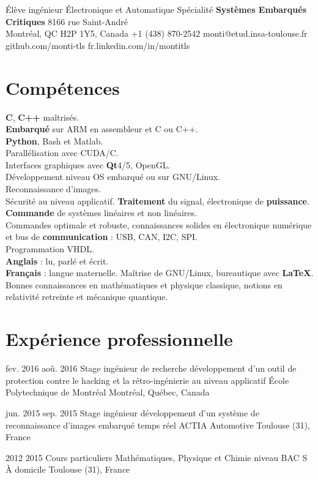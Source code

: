 \documentclass{custom_cv}
\begin{document}
           {Élève ingénieur}
           {Électronique et Automatique}
           {Spécialité \textbf{Systèmes Embarqués Critiques}}
           {8166 rue Saint-André\\Montréal, QC H2P 1Y5, Canada}
           {+1 (438) 870-2542}
           {monti@etud.insa-toulouse.fr}
           {github.com/monti-tls}
           {fr.linkedin.com/in/montitls}

\section{Compétences}

\begin{Skills}%
{\textbf{C}, \textbf{C++} maîtrisés.\\
\textbf{Embarqué} sur ARM en assembleur et C ou C++.\\
\textbf{Python}, Bash et Matlab.\\
Parallélisation avec CUDA/C.\\
Interfaces graphiques avec \textbf{Qt}4/5, OpenGL.\\
Développement niveau OS embarqué ou sur GNU/Linux.\\
Reconnaissance d'images.\\
Sécurité au niveau applicatif.}%
{\textbf{Traitement} du signal, électronique de \textbf{puissance}.\\
\textbf{Commande} de systèmes linéaires et non linéaires.\\
Commandes optimale et robuste, connaissances solides en électronique numérique et bus de \textbf{communication} : USB, CAN, I2C, SPI.\\
Programmation VHDL.}\\
{\textbf{Anglais} : lu, parlé et écrit.\\
\textbf{Français} : langue maternelle.}%
{Maîtrise de GNU/Linux, bureautique avec \textbf{\LaTeX}.\\
Bonnes connaissances en mathématiques et physique classique, notions en relativité retreinte et mécanique quantique.}%
\end{Skills}

\section{Expérience professionnelle}
\begin{Experience}
    \Item
    {fev. 2016}
    {aoû. 2016}
    {Stage ingénieur de recherche}
    {développement d'un outil de protection contre le hacking et la rétro-ingénierie au niveau applicatif}
    {École Polytechnique de Montréal}
    {Montréal, Québec, Canada}

    \Item
    {jun. 2015}
    {sep. 2015}
    {Stage ingénieur}
    {développement d'un système de reconnaissance d'images embarqué temps réel}
    {ACTIA Automotive}
    {Toulouse (31), France}

    \Item
    {2012}
    {2015}
    {Cours particuliers}
    {Mathématiques, Physique et Chimie niveau BAC S}
    {À domicile}
    {Toulouse (31), France}  
\end{Experience}
\end{document}
